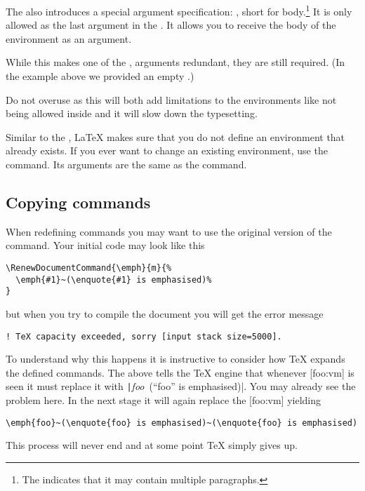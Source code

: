 The  also introduces a special argument
specification: , short for body.\footnote{The \cargv{+} indicates
  that it may contain multiple paragraphs.} It is only allowed as the last
argument in the . It allows you to receive the body of the
environment as an argument.
While this makes one of the ,  arguments redundant,
they are still required. (In the example above we provided an empty .)

Do not overuse  as this will both add limitations to the environments
like  not being allowed inside and it will slow down the
typesetting.

Similar to the , \LaTeX{} makes sure that you do not
define an environment that already exists. If you ever want to change an
existing environment, use the  command. Its
arguments are the same as the  command.

\subsection{Copying commands}\label{sec:copyingcommands}

When redefining commands you may want to use the original version of the
command. Your initial code may look like this
\begin{verbatim}
\RenewDocumentCommand{\emph}{m}{%
  \emph{#1}~(\enquote{#1} is emphasised)%
}
\end{verbatim}
but when you try to compile the document you will get the error message
\begin{verbatim}
! TeX capacity exceeded, sorry [input stack size=5000].
\end{verbatim}

To understand why this happens it is instructive to consider how \TeX{} expands
the defined commands. The above  tells the \TeX{}
engine that whenever [foo:vm] is seen it must replace it with
\texttt|\emph{foo}~(\enquote{foo} is emphasised)|. You may already see the
problem here. In the next stage it will again replace the [foo:vm]
yielding
\begin{verbatim}
\emph{foo}~(\enquote{foo} is emphasised)~(\enquote{foo} is emphasised)
\end{verbatim}
This process will never end and at some point \TeX{}
simply gives up.


